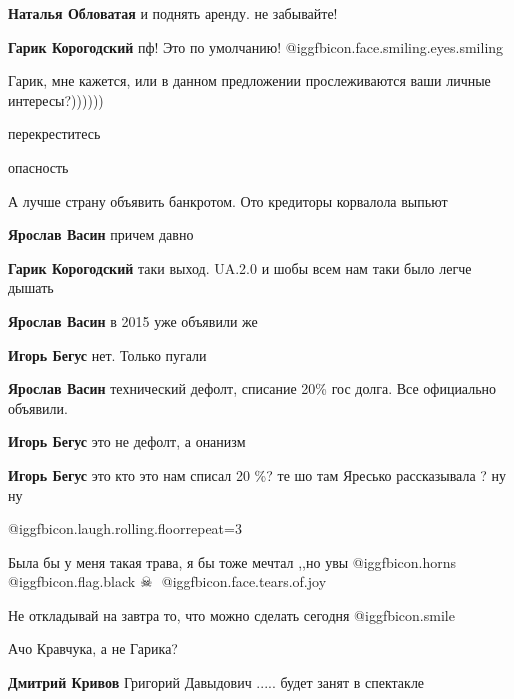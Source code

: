 \begin{itemize}
\begin{itemize} %
\textbf{Наталья Обловатая} и поднять аренду. не забывайте!

\textbf{Гарик Корогодский} пф! Это по умолчанию! @igg{fbicon.face.smiling.eyes.smiling} 
\end{itemize} %

Гарик, мне кажется, или в данном предложении прослеживаются ваши личные интересы?))))))

перекреститесь

опасность

А лучше страну объявить банкротом. Ото кредиторы корвалола выпьют

\begin{itemize} %
\textbf{Ярослав Васин} причем давно

\textbf{Гарик Корогодский} таки выход. UA.2.0 и шобы всем нам таки было легче дышать

\textbf{Ярослав Васин} в 2015 уже объявили же

\textbf{Игорь Бегус} нет. Только пугали

\textbf{Ярослав Васин} технический дефолт, списание 20\% гос долга. Все официально объявили.

\textbf{Игорь Бегус} это не дефолт, а онанизм

\textbf{Игорь Бегус} это кто это нам списал 20 \%? те шо там Яресько рассказывала ? ну ну
\end{itemize} %


@igg{fbicon.laugh.rolling.floor}{repeat=3} 


Была бы у меня такая трава, я бы тоже мечтал ,,но увы  @igg{fbicon.horns}
@igg{fbicon.flag.black}  ☠ ️  @igg{fbicon.face.tears.of.joy} 

Не откладывай на завтра то, что можно сделать сегодня  @igg{fbicon.smile} 

Ачо Кравчука, а не Гарика?

\begin{itemize} %
\textbf{Дмитрий Кривов} Григорий Давыдович ..... будет занят в спектакле


\end{itemize}
\end{itemize}
